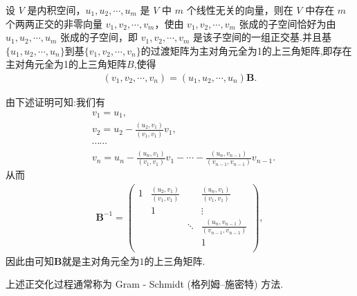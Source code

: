 \documentclass[../../main.tex]{subfiles}%
\begin{document}
\begin{theorem}\label{theorem:Gram-Schmidt正交化方法}
设 $V$ 是内积空间，$u_1, u_2, \cdots, u_m$ 是 $V$ 中 $m$ 个线性无关的向量，则在 $V$ 中存在 $m$ 个两两正交的非零向量 $v_1, v_2, \cdots, v_m$，使由 $v_1, v_2, \cdots, v_m$ 张成的子空间恰好为由 $u_1, u_2, \cdots, u_m$ 张成的子空间，即 $v_1, v_2, \cdots, v_m$ 是该子空间的一组正交基.并且基$\{u_1,u_2,\cdots,u_n\}$到基$\{v_1,v_2,\cdots,v_n\}$的过渡矩阵为主对角元全为1的上三角矩阵,即存在主对角元全为1的上三角矩阵$B$,使得
\begin{align*}
(v_1,v_2,\cdots,v_n)=(u_1,u_2,\cdots,u_n)\boldsymbol{B}.
\end{align*}
\end{theorem}
\begin{note}
由下述证明可知:我们有
\begin{align*}
&v_1=u_1,
\\
&v_2=u_2-\frac{(u_2,v_1)}{(v_1,v_1)}v_1,
\\
&\cdots \cdots 
\\
&v_n=u_n-\frac{(u_n,v_1)}{(v_1,v_1)}v_1-\cdots -\frac{(u_n,v_{n-1})}{(v_{n-1},v_{n-1})}v_{n-1}.
\end{align*}
从而
\begin{align*}
\boldsymbol{B}^{-1}=\begin{pmatrix}
1&		\frac{( u_2,v_1 )}{( v_1,v_1 )}&		&		\frac{( u_n,v_1 )}{( v_1,v_1 )}\\
&		1&		&		\vdots\\
&		&		\ddots&		\frac{( u_n,v_{n-1} )}{( v_{n-1},v_{n-1} )}\\
&		&		&		1\\
\end{pmatrix},
\end{align*}
因此由可知$\boldsymbol{B}$就是主对角元全为$1$的上三角矩阵.
\end{note}
\begin{remark}
上述正交化过程通常称为 Gram - Schmidt (格列姆--施密特) 方法.
\end{remark}
\end{document}
